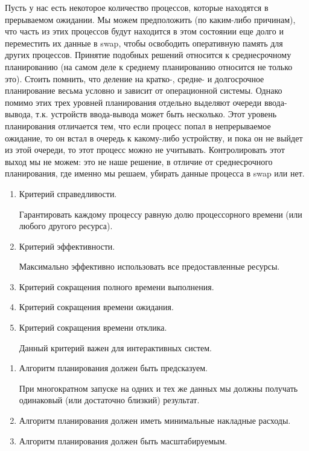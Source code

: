 Пусть у нас есть некоторое количество процессов, которые находятся в прерываемом
ожидании. Мы можем предположить (по каким-либо причинам), что часть из этих
процессов будут находится в этом состоянии еще долго и переместить их данные в
swap, чтобы освободить оперативную память для других процессов. Принятие
подобных решений относится к среднесрочному планированию (на самом деле к
среднему планированию относится не только это). Стоить помнить, что деление на
кратко-, средне- и долгосрочное планирование весьма условно и зависит от
операционной системы. Однако помимо этих трех уровней планирования отдельно
выделяют очереди ввода-вывода, т.к. устройств ввода-вывода может быть несколько.
Этот уровень планирования отличается тем, что если процесс попал в непрерываемое
ожидание, то он встал в очередь к какому-либо устройству, и пока он не выйдет из
этой очереди, то этот процесс можно не учитывать. Контролировать этот выход мы
не можем: это не наше решение, в отличие от среднесрочного планирования, где
именно мы решаем, убирать данные процесса в swap или нет.


\begin{enumerate}
\item
  Критерий справедливости.

  Гарантировать каждому процессу равную долю процессорного времени (или любого
  другого ресурса).

\item
  Критерий эффективности.

  Максимально эффективно использовать все предоставленные ресурсы.

\item
  Критерий сокращения полного времени выполнения.

\item
  Критерий сокращения времени ожидания.

\item
  Критерий сокращения времени отклика.

  Данный критерий важен для интерактивных систем.
\end{enumerate}


\begin{enumerate}
\item
  Алгоритм планирования должен быть предсказуем.

  При многократном запуске на одних и тех же данных мы должны получать
  одинаковый (или достаточно близкий) результат.

\item
  Алгоритм планирования должен иметь минимальные накладные расходы.

\item
  Алгоритм планирования должен быть масштабируемым.
\end{enumerate}

